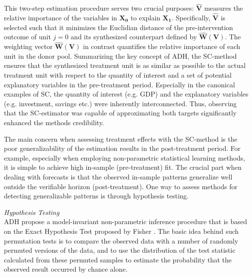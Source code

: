 This two-step estimation procedure serves two crucial purposes: $\widehat{\boldsymbol{V}}$ measures the relative importance of the variables in $\boldsymbol{X_0}$ to explain $\boldsymbol{X_1}$. Specifically, $\widehat{\boldsymbol{V}}$ is selected such that it minimizes the Euclidian distance of the pre-intervention outcome of unit $j = 0$ and its synthesized counterpart defined by $\widehat{\boldsymbol{W}}(\boldsymbol{V})$. The weighting vector $\widehat{\boldsymbol{W}}(\boldsymbol{V})$ in contrast quantifies the relative importance of each unit in the donor pool. Summarizing the key concept of \ac{ADH}, the \ac{SC}-method ensures that the synthesized treatment unit is as similar as possible to the actual treatment unit with respect to the quantity of interest and a set of potential explanatory variables in the pre-treatment period. Especially in the canonical examples of \ac{SC}, the quantity of interest (e.g. \ac{GDP}) and the explanatory variables (e.g. investment, savings etc.) were inherently interconnected. Thus, observing that the \ac{SC}-estimator was capable of approximating both targets significantly enhanced the methods credibility. 

The main concern when assessing treatment effects with the \ac{SC}-method is the poor 
generalizability of the estimation results in the post-treatment period. For example, especially when employing non-parametric statistical learning methods, it is simple to achieve high in-sample (pre-treatment) fit. The crucial part when dealing with forecasts is that the observed in-sample patterns generalize well outside the verifiable horizon (post-treatment). One way to assess methods for detecting generalizable patterns is through hypothesis testing.

\textit{Hypothesis Testing} \\
\ac{ADH} propose a model-invariant non-parametric inference procedure that is based on the Exact Hypothesis Test proposed by Fisher \cite{fisher:1971}. The basic idea behind such permutation tests is to compare the observed data with a number of randomly permuted versions of the data, and to use the distribution of the test statistic calculated from these permuted samples to estimate the probability that the observed result occurred by chance alone. 

